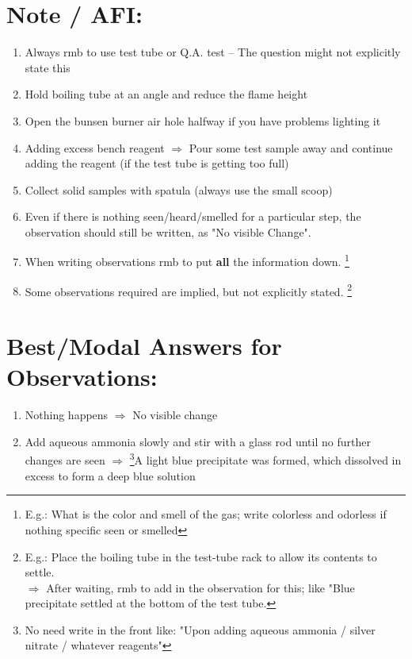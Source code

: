 \documentclass[oneside]{book}
\begin{document}
\section{Note / AFI:}
\begin{enumerate}
    \item Always rmb to use test tube or Q.A. test \small -- The question might not explicitly state this \normalsize
    \item Hold boiling tube at an angle and reduce the flame height
    \item Open the bunsen burner air hole halfway \small if you have problems lighting it \normalsize
    \item Adding excess bench reagent \( \Rightarrow \) Pour some test sample away and continue adding the reagent \small (if the test tube is getting too full) \normalsize
    \item Collect solid samples with spatula \small (always use the small scoop) \normalsize
    \item Even if there is nothing seen/heard/smelled for a particular step, the observation should still be written, as "No visible Change".
    \item When writing observations rmb to put \textbf{all} the information down. \footnote{E.g.: What is the color and smell of the gas; write colorless and odorless if nothing specific seen or smelled} \normalsize
    \item Some observations required are implied, but not explicitly stated. \footnote{E.g.: Place the boiling tube in the test-tube rack to allow its contents to settle.\\
    \( \Rightarrow \) After waiting, rmb to add in the observation for this; like "Blue precipitate settled at the bottom of the test tube.}
\end{enumerate} \vspace{2mm}
\section{Best/Modal Answers for Observations:}
\begin{enumerate}
    \item Nothing happens \(\Rightarrow\) No visible change
    \item Add aqueous ammonia slowly and stir with a glass rod until no further changes are seen \(\Rightarrow\) \footnote{No need write in the front like: "Upon adding aqueous ammonia / silver nitrate / whatever reagents"}A light blue precipitate was formed, which dissolved in excess to form a deep blue solution
\end{enumerate}
\end{document}
